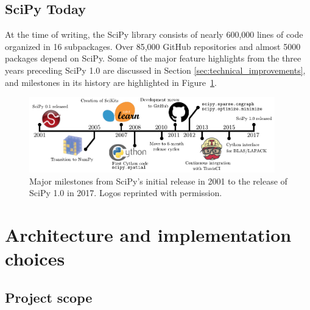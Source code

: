 \documentclass[fleqn,10pt]{wlscirep}
\begin{document}
\subsection*{SciPy Today}
At the time of writing, the SciPy library consists of nearly 
600,000 lines of code organized in 16 subpackages. 
Over 85,000 GitHub repositories and almost 5000 packages depend
on SciPy. Some of the major
feature highlights from the three years preceding
SciPy 1.0 are discussed in Section \ref{sec:technical_improvements}, 
and milestones in its history are highlighted in Figure~\ref{fig:timeline}.

\begin{figure}[H]
\centering
\includegraphics[width=0.95\textwidth]{static/scipy_timeline}
\caption{Major milestones from SciPy's initial release in 2001 to
the release of SciPy 1.0 in 2017. Logos reprinted with permission.}
\label{fig:timeline}
\end{figure}




\section*{Architecture and implementation choices}
\subsection*{Project scope}
\end{document}
